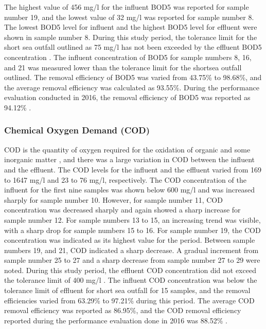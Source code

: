The highest value of 456 mg/l for the influent \ac{BOD5} was reported for sample number 19, and the lowest value of 32 mg/l was reported for sample number 8. The lowest \ac{BOD5} level for influent and the highest \ac{BOD5} level for effluent were shown in sample number 8. During this study period, the tolerance limit for the short sea outfall outlined as 75 mg/l has not been exceeded by the effluent \ac{BOD5} concentration \cite{CEA2022}. The influent concentration of \ac{BOD5} for sample numbers 8, 16, and 21 was measured lower than the tolerance limit for the shortsea outfall outlined. The removal efficiency of \ac{BOD5} was varied from 43.75\% to 98.68\%, and the average removal efficiency was calculated as 93.55\%. During the performance evaluation conducted in 2016, the removal efficiency of \ac{BOD5} was reported as 94.12\% \cite{Danushika2016}.




\subsubsection{Chemical Oxygen Demand (COD)}
\ac{COD} is the quantity of oxygen required for the oxidation of organic and some inorganic matter \cite{Prasad2020}, and there was a large variation in \ac{COD} between the influent and the effluent. The \ac{COD} levels for the influent and the effluent varied from 169 to 1647 mg/l and 23 to 76 mg/l, respectively. The \ac{COD} concentration of the influent for the first nine samples was shown below 600 mg/l and was increased sharply for sample number 10. However, for sample number 11, \ac{COD} concentration was decreased sharply and again showed a sharp increase for sample number 12. For sample numbers 13 to 15, an increasing trend was visible, with a sharp drop for sample numbers 15 to 16. For sample number 19, the \ac{COD} concentration was indicated as its highest value for the period. Between sample numbers 19, and 21, \ac{COD} indicated a sharp decrease. A gradual increment from sample number 25 to 27 and a sharp decrease from sample number 27 to 29 were noted. During this study period, the effluent \ac{COD} concentration did not exceed the tolerance limit of 400 mg/l \cite{CEA2022}. The influent \ac{COD} concentration was below the tolerance limit of effluent for short sea outfall for 15 samples, and the removal efficiencies varied from 63.29\% to 97.21\% during this period. The average \ac{COD} removal efficiency was reported as 86.95\%, and the \ac{COD} removal efficiency reported during the performance evaluation done in 2016 was 88.52\% \cite{Danushika2016}.

